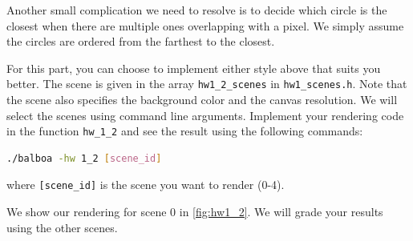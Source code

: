 Another small complication we need to resolve is to decide which circle is the closest when there are multiple ones overlapping with a pixel. We simply assume the circles are ordered from the farthest to the closest. 

For this part, you can choose to implement either style above that suits you better. The scene is given in the array \lstinline{hw1_2_scenes} in \lstinline{hw1_scenes.h}. Note that the scene also specifies the background color and the canvas resolution. We will select the scenes using command line arguments. Implement your rendering code in the function \lstinline{hw_1_2} and see the result using the following commands:
\begin{lstlisting}[language=bash]
  ./balboa -hw 1_2 [scene_id]
\end{lstlisting}
where \lstinline{[scene_id]} is the scene you want to render (0-4).

We show our rendering for scene 0 in \cref{fig:hw1_2}. We will grade your results using the other scenes.


